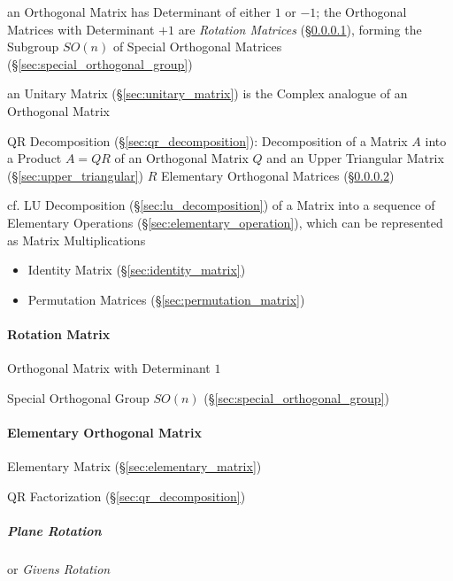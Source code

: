 an Orthogonal Matrix has Determinant of either $1$ or $-1$; the Orthogonal
Matrices with Determinant $+1$ are \emph{Rotation Matrices}
(\S\ref{sec:rotation_matrix}), forming the Subgroup $SO(n)$ of Special
Orthogonal Matrices (\S\ref{sec:special_orthogonal_group})

\fist an Unitary Matrix (\S\ref{sec:unitary_matrix}) is the Complex analogue of
an Orthogonal Matrix

QR Decomposition (\S\ref{sec:qr_decomposition}): Decomposition of a Matrix $A$
into a Product $A = QR$ of an Orthogonal Matrix $Q$ and an Upper Triangular
Matrix (\S\ref{sec:upper_triangular}) $R$ \fist Elementary Orthogonal Matrices
(\S\ref{sec:elementary_orthogonal_matrix})

cf. LU Decomposition (\S\ref{sec:lu_decomposition}) of a Matrix into a sequence
of Elementary Operations (\S\ref{sec:elementary_operation}), which can be
represented as Matrix Multiplications

\begin{itemize}
  \item Identity Matrix (\S\ref{sec:identity_matrix})
  \item Permutation Matrices (\S\ref{sec:permutation_matrix})
\end{itemize}



\paragraph{Rotation Matrix}\label{sec:rotation_matrix}\hfill

Orthogonal Matrix with Determinant $1$

Special Orthogonal Group $SO(n)$ (\S\ref{sec:special_orthogonal_group})



\paragraph{Elementary Orthogonal Matrix}
\label{sec:elementary_orthogonal_matrix}\hfill

Elementary Matrix (\S\ref{sec:elementary_matrix})

QR Factorization (\S\ref{sec:qr_decomposition})



\subparagraph{Plane Rotation}\label{sec:plane_rotation}\hfill

or \emph{Givens Rotation}

